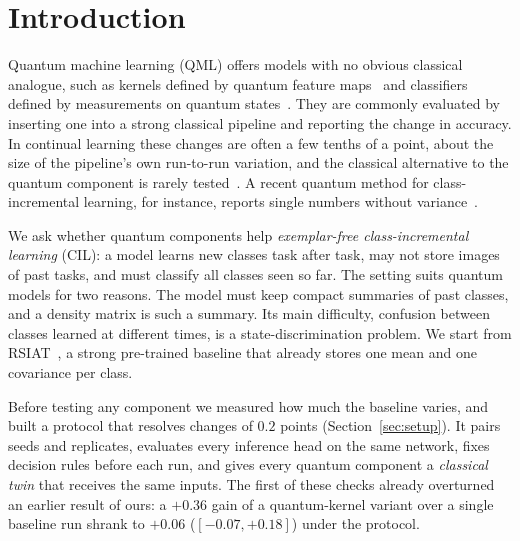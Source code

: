 \section{Introduction}
\label{sec:intro}

Quantum machine learning (QML) offers models with no obvious classical
analogue, such as kernels defined by quantum feature
maps~\citep{huang2021power} and classifiers defined by measurements on quantum
states~\citep{hausladen1994pgm}. They are commonly evaluated by inserting one
into a strong classical pipeline and reporting the change in accuracy. In
continual learning these changes are often a few tenths of a point, about the
size of the pipeline's own run-to-run variation, and the classical alternative
to the quantum component is rarely tested~\citep{bowles2024better}. A recent
quantum method for class-incremental learning, for instance, reports single
numbers without variance~\citep{li2026qkd}.

We ask whether quantum components help \emph{exemplar-free class-incremental
learning} (CIL): a model learns new classes task after task, may not store
images of past tasks, and must classify all classes seen so far. The setting
suits quantum models for two reasons. The model must keep compact summaries of
past classes, and a density matrix is such a summary. Its main difficulty,
confusion between classes learned at different times, is a state-discrimination
problem. We start from RSIAT~\citep{rsiat}, a strong pre-trained baseline that
already stores one mean and one covariance per class.

Before testing any component we measured how much the baseline varies, and
built a protocol that resolves changes of $0.2$ points
(Section~\ref{sec:setup}). It pairs seeds and replicates, evaluates every
inference head on the same network, fixes decision rules before each run, and
gives every quantum component a \emph{classical twin} that receives the same
inputs. The first of these checks already overturned an earlier result of ours:
a $+0.36$ gain of a quantum-kernel variant over a single baseline run shrank to
$+0.06$ ($[-0.07,+0.18]$) under the protocol.

